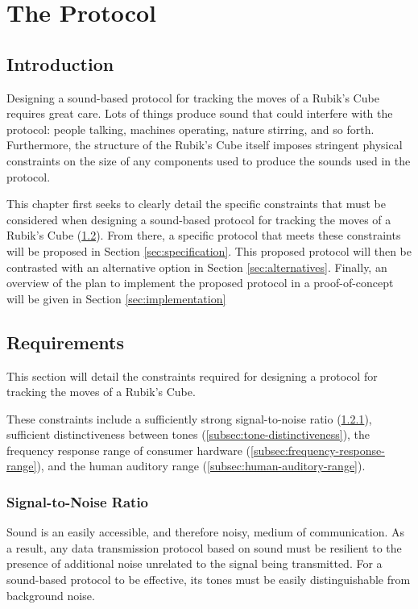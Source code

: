 \chapter{The Protocol} %

\label{Chapter4} %


\section{Introduction}
Designing a sound-based protocol for tracking the moves of a Rubik's Cube requires great care.
Lots of things produce sound that could interfere with the protocol: people talking, machines operating, nature stirring, and so forth.
Furthermore, the structure of the Rubik's Cube itself imposes stringent physical constraints on the size of any components used to produce the sounds used in the protocol.

This chapter first seeks to clearly detail the specific constraints that must be considered when designing a sound-based protocol for tracking the moves of a Rubik's Cube (\ref{sec:protocol-requirements}).
From there, a specific protocol that meets these constraints will be proposed in Section \ref{sec:specification}.
This proposed protocol will then be contrasted with an alternative option in Section \ref{sec:alternatives}.
Finally, an overview of the plan to implement the proposed protocol in a proof-of-concept will be given in Section \ref{sec:implementation}


\section{Requirements}
\label{sec:protocol-requirements}
This section will detail the constraints required for designing a protocol for tracking the moves of a Rubik's Cube.

These constraints include a sufficiently strong signal-to-noise ratio (\ref{subsec:signal-to-noise-ratio}), sufficient distinctiveness between tones (\ref{subsec:tone-distinctiveness}), the frequency response range of consumer hardware (\ref{subsec:frequency-response-range}), and the human auditory range (\ref{subsec:human-auditory-range}).

\subsection{Signal-to-Noise Ratio}
\label{subsec:signal-to-noise-ratio}
Sound is an easily accessible, and therefore noisy, medium of communication.
As a result, any data transmission protocol based on sound must be resilient to the presence of additional noise unrelated to the signal being transmitted.
For a sound-based protocol to be effective, its tones must be easily distinguishable from background noise.

